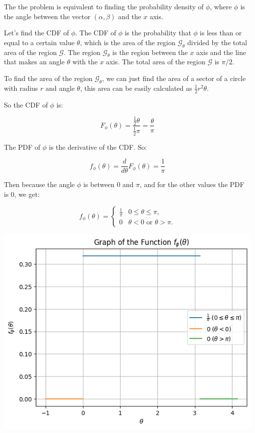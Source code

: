 The the problem is equivalent to finding the probability density of $\phi$,
where $\phi$ is the angle between the vector $(\alpha, \beta)$ and the $x$ axis.

Let's find the CDF of $\phi$. The CDF of $\phi$ is the probability that
$\phi$ is less than or equal to a certain value $\theta$, which is the
area of the region $\mathcal{G}_\theta$ divided by the total area of
the region $\mathcal{G}$. The region $\mathcal{G}_\theta$ is the region
between the $x$ axis and the line that makes an angle $\theta$ with
the $x$ axis. The total area of the region $\mathcal{G}$ is $\pi / 2$.

To find the area of the region $\mathcal{G}_\theta$, we can just
find the area of a sector of a circle with radius $r$ and angle $\theta$,
this area can be easily calculated as $\frac{1}{2} r^2 \theta$.

So the CDF of $\phi$ is:

\begin{equation}
    F_\phi(\theta) = \frac{\frac{1}{2} \theta}{\frac{1}{2} \pi} = \frac{\theta}{\pi}
\end{equation}

The PDF of $\phi$ is the derivative of the CDF. So:

\begin{equation}
    f_\phi(\theta) = \frac{d}{d\theta} F_\phi(\theta) = \frac{1}{\pi}
\end{equation}

Then because the angle $\phi$ is between $0$ and $\pi$, and for
the other values the PDF is $0$, we get:

\begin{equation}
    f_\phi(\theta) =
    \begin{cases}
        \frac{1}{\pi} & 0 \leq \theta \leq \pi,              \\
        0             & \theta < 0 \text{ or } \theta > \pi.
    \end{cases}
\end{equation}

\includegraphics[width=\textwidth]{images/p2.png}